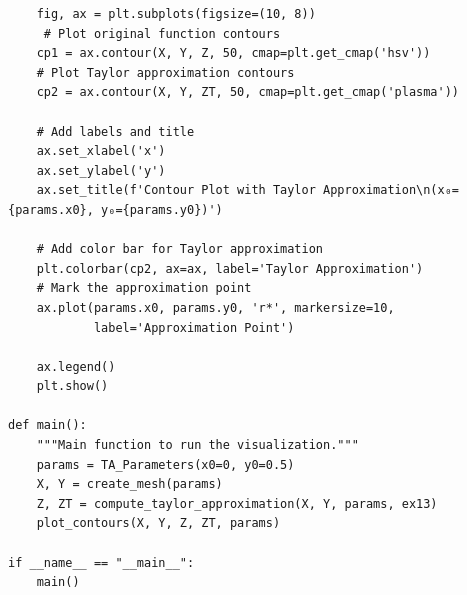 \documentclass{article}
\begin{document}
\begin{lstlisting}
    fig, ax = plt.subplots(figsize=(10, 8))
     # Plot original function contours
    cp1 = ax.contour(X, Y, Z, 50, cmap=plt.get_cmap('hsv'))
    # Plot Taylor approximation contours
    cp2 = ax.contour(X, Y, ZT, 50, cmap=plt.get_cmap('plasma'))

    # Add labels and title
    ax.set_xlabel('x')
    ax.set_ylabel('y')
    ax.set_title(f'Contour Plot with Taylor Approximation\n(x₀={params.x0}, y₀={params.y0})')

    # Add color bar for Taylor approximation
    plt.colorbar(cp2, ax=ax, label='Taylor Approximation')
    # Mark the approximation point
    ax.plot(params.x0, params.y0, 'r*', markersize=10,
            label='Approximation Point')

    ax.legend()
    plt.show()

def main():
    """Main function to run the visualization."""
    params = TA_Parameters(x0=0, y0=0.5)
    X, Y = create_mesh(params)
    Z, ZT = compute_taylor_approximation(X, Y, params, ex13)
    plot_contours(X, Y, Z, ZT, params)

if __name__ == "__main__":
    main()



\end{lstlisting}
\end{document}

